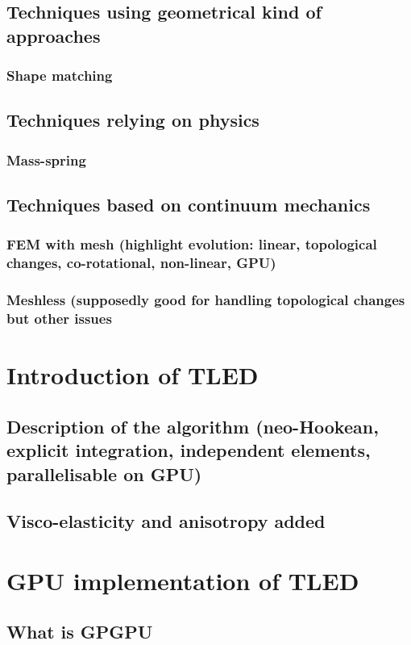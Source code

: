 		\section{Techniques using geometrical kind of approaches}
			\subsection{Shape matching}
		\section{Techniques relying on physics}
			\subsection{Mass-spring}
		\section{Techniques based on continuum mechanics}	
			\subsection{FEM with mesh (highlight evolution: linear, topological changes, co-rotational, non-linear, GPU)}
			\subsection{Meshless (supposedly good for handling topological changes but other issues}
		
	\chapter{Introduction of TLED}
		\section{Description of the algorithm (neo-Hookean, explicit integration, independent elements, parallelisable on GPU)}
		\section{Visco-elasticity and anisotropy added }

	\chapter{GPU implementation of TLED}
		\section{What is GPGPU}
